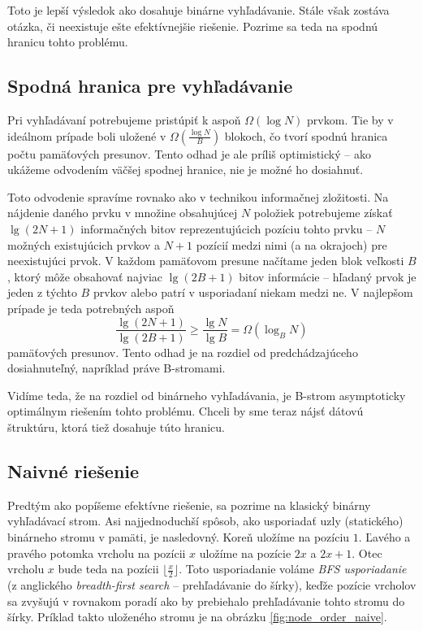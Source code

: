Toto je lepší výsledok ako dosahuje binárne vyhľadávanie. Stále však zostáva otázka, či neexistuje  ešte efektívnejšie riešenie. Pozrime sa teda na spodnú hranicu tohto problému.

\subsection{Spodná hranica pre vyhľadávanie} \label{sec:tree-lowerbound}
Pri vyhľadávaní potrebujeme pristúpiť k aspoň $\Omega(\log{N})$ prvkom. Tie by v ideálnom prípade boli uložené v $\Omega(\frac{\log{N}}{B})$ blokoch, čo tvorí spodnú hranica počtu pamäťových presunov. Tento odhad je ale príliš optimistický -- ako ukážeme odvodením väčšej spodnej hranice, nie je možné ho dosiahnuť.

Toto odvodenie spravíme rovnako ako v \citep{demaineoverview} technikou informačnej zložitosti. Na nájdenie daného prvku v množine obsahujúcej $N$ položiek potrebujeme získať $\lg(2N+1)$ informačných bitov reprezentujúcich pozíciu tohto prvku -- $N$ možných existujúcich prvkov a $N+1$ pozícií medzi nimi (a na okrajoch) pre neexistujúci prvok. V každom pamäťovom presune načítame jeden blok veľkosti $B$, ktorý môže obsahovať najviac $\lg(2B+1)$ bitov informácie -- hľadaný prvok je jeden z týchto $B$ prvkov alebo patrí v usporiadaní niekam medzi ne. V najlepšom prípade je teda potrebných aspoň
\[
\frac{\lg(2N+1)}{\lg(2B+1)} \ge \frac{\lg N}{\lg B} = \Omega(\log_B{N})
\]
pamäťových presunov. Tento odhad je na rozdiel od predchádzajúceho dosiahnuteľný, napríklad práve \aware B-stromami.

Vidíme teda, že na rozdiel od \obliv binárneho vyhľadávania, je \aware B-strom asymptoticky optimálnym riešením tohto problému. Chceli by sme teraz nájsť \obliv dátovú štruktúru, ktorá tiež dosahuje túto hranicu.

\subsection{Naivné \obliv riešenie} \label{sec:static-naive}
Predtým ako popíšeme efektívne \obliv riešenie, sa pozrime na klasický binárny vyhľadávací strom. Asi najjednoduchší spôsob, ako usporiadať uzly (statického) binárneho stromu v pamäti, je nasledovný. Koreň uložíme na pozíciu $1$. Ľavého a pravého potomka vrcholu na pozícii $x$ uložíme na pozície $2x$ a $2x+1$. Otec vrcholu $x$ bude teda na pozícii $\lfloor\frac{x}{2}\rfloor$. Toto usporiadanie voláme \emph{BFS usporiadanie} (z anglického \emph{breadth-first search} -- prehľadávanie do šírky), keďže pozície vrcholov sa zvyšujú v rovnakom poradí ako by prebiehalo prehľadávanie tohto stromu do šírky. Príklad takto uloženého stromu je na obrázku \ref{fig:node_order_naive}.


